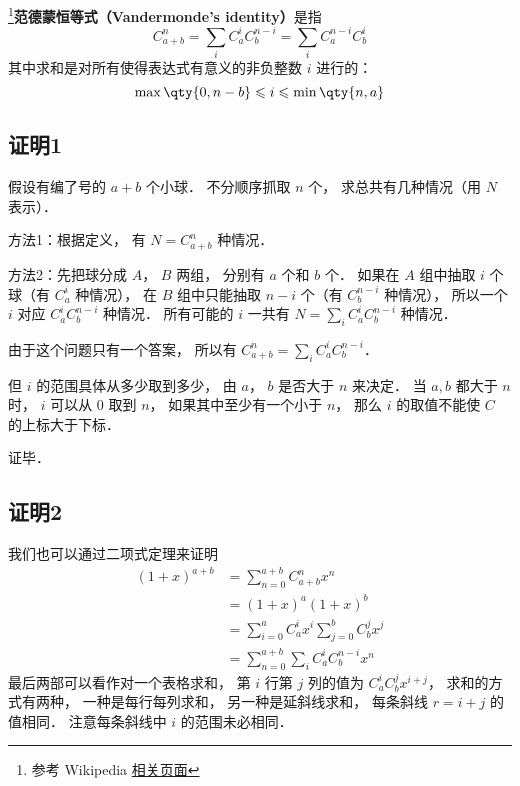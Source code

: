 

\footnote{参考 Wikipedia \href{https://en.wikipedia.org/wiki/Vandermonde's_identity}{相关页面}}\textbf{范德蒙恒等式（Vandermonde's identity）}是指
\begin{equation}
C_{a + b}^n = \sum_i C_a^i C_b^{n-i} = \sum\limits_i C_a^{n-i}C_b^i
\end{equation}
其中求和是对所有使得表达式有意义的非负整数 $i$ 进行的：
\begin{equation}
\max\qty{0, n-b} \leqslant i \leqslant \min\qty{n, a}
\end{equation}

\subsection{证明1}

假设有编了号的 $a+b$ 个小球． 不分顺序抓取 $n$ 个， 求总共有几种情况（用 $N$ 表示）．

方法1：根据定义， 有 $N = C_{a+b}^n$ 种情况．

方法2：先把球分成 $A$，  $B$ 两组， 分别有 $a$ 个和 $b$ 个． 如果在 $A$ 组中抽取 $i$ 个球（有 $C_a^i$ 种情况）， 在 $B$ 组中只能抽取  $n - i$ 个（有 $C_b^{n-i}$ 种情况）， 所以一个 $i$ 对应 $C_a^i C_b^{n-i}$ 种情况． 所有可能的 $i$ 一共有 $N = \sum_i C_a^i C_b^{n-i}$ 种情况．

由于这个问题只有一个答案， 所以有 $C_{a+b}^n = \sum_i C_a^i C_b^{n-i}$． 

但 $i$ 的范围具体从多少取到多少， 由 $a$，  $b$ 是否大于 $n$ 来决定． 当 $a,b$ 都大于 $n$ 时， $i$ 可以从 0 取到 $n$，  如果其中至少有一个小于 $n$，  那么 $i$ 的取值不能使 $C$ 的上标大于下标．

证毕．

\subsection{证明2}
我们也可以通过二项式定理来证明
\begin{equation}
\begin{aligned}
(1 + x)^{a+b} &= \sum_{n=0}^{a+b} C_{a+b}^n x^n\\
&=(1+x)^a (1+x)^b\\
&=\sum_{i=0}^a C_a^i x^i  \sum_{j=0}^b C_b^j x^j\\
&=\sum_{n=0}^{a+b} \sum_{i} C_a^i C_b^{n-i} x^n
\end{aligned}
\end{equation}
最后两部可以看作对一个表格求和， 第 $i$ 行第 $j$ 列的值为 $C_a^i C_b^j x^{i+j}$， 求和的方式有两种， 一种是每行每列求和， 另一种是延斜线求和， 每条斜线 $r = i+j$ 的值相同． 注意每条斜线中 $i$ 的范围未必相同．
